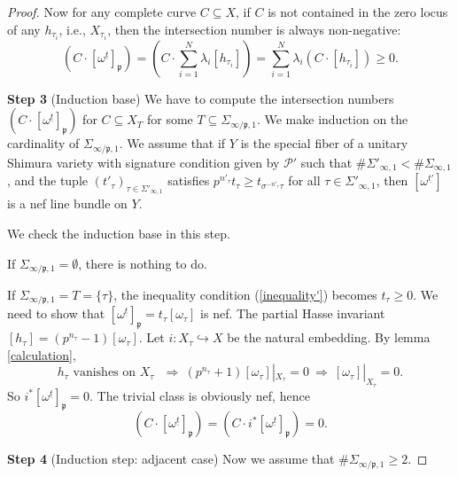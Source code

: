 \documentclass{article}
\begin{document}
\begin{proof}
Now for any complete curve $C\subseteq X$, if $C$ is not contained in the zero locus of any $h_{\tau_i}$, i.e., $X_{\tau_i}$, then the intersection number is always non-negative:
\begin{equation}
(C\cdot [\omega^{\underline{t}}]_\mathfrak{p})=(C\cdot\sum_{i=1}^N\lambda_i[h_{\tau_i}])=\sum_{i=1}^N\lambda_i(C\cdot[h_{\tau_i}])\ge0.
\end{equation}





\medskip
\noindent
\textbf{Step 3} (Induction base) We have to compute the intersection numbers $(C\cdot [\omega^{\underline{t}}]_\mathfrak{p})$ for $C\subseteq X_T$ for some $T\subseteq \Sigma_{\infty/\mathfrak{p},1}$. We make induction on the cardinality of $\Sigma_{\infty/\mathfrak{p},1}$. We assume that if $Y$ is the special fiber of a unitary Shimura variety with signature condition given by $\mathcal{P}'$ such that $\#\Sigma'_{\infty,1}<\#\Sigma_{\infty,1}$, and the tuple $(t'_{\tau})_{\tau\in\Sigma'_{\infty,1}}$ satisfies $p^{n'_\tau}t_\tau\ge t_{\sigma^{-n'_\tau}\tau}$ for all $\tau\in\Sigma'_{\infty,1}$, then $[\omega^{\underline{t'}}]$ is a nef line bundle on $Y$.

We check the induction base in this step.

If $\Sigma_{\infty/\mathfrak{p},1}=\emptyset$, there is nothing to do. 

If $\Sigma_{\infty/\mathfrak{p},1}=T=\{\tau\}$, the inequality condition (\ref{inequality'}) becomes $t_\tau\ge0$. We need to show that $[\omega^{\underline{t}}]_\mathfrak{p}=t_\tau[\omega_\tau]$ is nef. The partial Hasse invariant $[h_\tau]=(p^{n_\tau}-1)[\omega_\tau]$. Let $i:X_\tau\hookrightarrow X$ be the natural embedding. By lemma \ref{calculation},
\begin{equation}
h_\tau \text{ vanishes on $X_\tau$ }\Rightarrow\  (p^{n_\tau}+1)[\omega_\tau]|_{X_\tau}=0\ \Rightarrow\  [\omega_\tau]|_{X_\tau}=0.
\end{equation}
So $i^\ast[\omega^{\underline{t}}]_\mathfrak{p}=0$. The trivial class is obviously nef, hence
\begin{equation}
(C\cdot [\omega^{\underline{t}}]_{\mathfrak{p}})=(C\cdot i^\ast[\omega^{\underline{t}}]_{\mathfrak{p}})=0.
\end{equation}





\medskip
\noindent
\textbf{Step 4} (Induction step: adjacent case) Now we assume that $\#\Sigma_{\infty/\mathfrak{p},1}\ge2$.


\end{proof}
\end{document}
